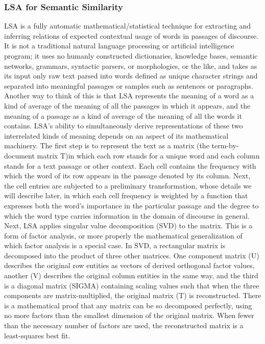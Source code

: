\subsubsection{LSA for Semantic Similarity}
LSA is a fully automatic mathematical/statistical technique for extracting and inferring relations of expected contextual usage of words in passages of discourse. It is not a traditional natural language processing or artificial intelligence program; it uses no humanly constructed dictionaries, knowledge bases, semantic networks, grammars, syntactic parsers, or morphologies, or the like, and takes as its input only raw text parsed into words defined as unique character strings and separated into meaningful passages or samples such as sentences or paragraphs.
Another way to think of this is that LSA represents the meaning of a word as a kind of average of the meaning of all the passages in which it appears, and the meaning of a passage as a kind of average of the meaning of all the words it contains. LSA's ability to simultaneously derive representations of these two interrelated kinds of meaning depends on an aspect of its mathematical machinery.
The first step is to represent the text as a matrix (the term-by-document matrix T)in which each row stands for a unique word and each column stands for a text passage or other context. Each cell contains the frequency with which the word of its row appears in the passage denoted by its column. Next, the cell entries are subjected to a preliminary transformation, whose details we will describe later, in which each cell frequency is weighted by a function that expresses both the word's importance in the particular passage and the degree to which the word type carries information in the domain of discourse in general.
Next, LSA applies singular value decomposition (SVD) to the matrix. This is a form of factor analysis, or more properly the mathematical generalization of which factor analysis is a special case. In SVD, a rectangular matrix is decomposed into the product of three other matrices. One component matrix (U) describes the original row entities as vectors of derived orthogonal factor values, another (V) describes the original column entities in the same way, and the third is a diagonal matrix (SIGMA) containing scaling values such that when the three components are matrix-multiplied, the original matrix (T) is reconstructed. 
There is a mathematical proof that any matrix can be so decomposed perfectly, using no more factors than the smallest dimension of the original matrix. When fewer than the necessary number of factors are used, the reconstructed matrix is a least-squares best fit. 

